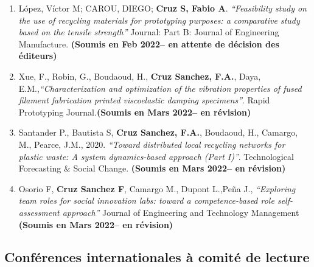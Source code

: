 \documentclass[
  12pt,
  oneside]{book}
\begin{document}
\begin{enumerate}
\def\labelenumi{\arabic{enumi}.}
\item
  López, Víctor M; CAROU, DIEGO; \textbf{Cruz S, Fabio A}. \emph{``Feasibility study on the use of recycling materials for prototyping purposes: a comparative study based on the tensile strength''} Journal: Part B: Journal of Engineering Manufacture. \textbf{(Soumis en Feb 2022-- en attente de décision des éditeurs)}
\item
  Xue, F., Robin, G., Boudaoud, H., \textbf{Cruz Sanchez, F.A.}, Daya, E.M.,\emph{``Characterization and optimization of the vibration properties of fused filament fabrication printed viscoelastic damping specimens''}. Rapid Prototyping Journal.\textbf{(Soumis en Mars 2022-- en révision)}
\item
  Santander P., Bautista S, \textbf{Cruz Sanchez, F.A.}, Boudaoud, H., Camargo, M., Pearce, J.M., 2020. \emph{``Toward distributed local recycling networks for plastic waste: A system dynamics-based approach (Part I)''}. Technological Forecasting \& Social Change. \textbf{(Soumis en Mars 2022-- en révision)}
\item
  Osorio F, \textbf{Cruz Sanchez F}, Camargo M., Dupont L.,Peña J., \emph{``Exploring team roles for social innovation labs: toward a competence-based role self-assessment approach''} Journal of Engineering and Technology Management \textbf{(Soumis en Mars 2022-- en révision)}
\end{enumerate}

\hypertarget{confuxe9rences-internationales-uxe0-comituxe9-de-lecture}{%
\subsection{Conférences internationales à comité de lecture}\label{confuxe9rences-internationales-uxe0-comituxe9-de-lecture}}
\end{document}
